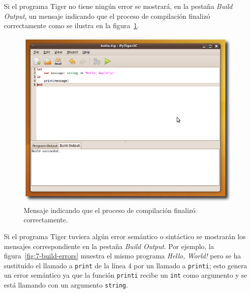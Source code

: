 \documentclass{article}
\begin{document}
\newpage

Si el programa Tiger no tiene ningún error se mostrará, en la pestaña
\emph{Build Output}, un mensaje indicando que el proceso de compilación
finalizó correctamente como se ilustra en la figura~\ref{fig:6-build-succeded}.

\begin{figure}[htb]
  \centering
  \includegraphics[width=5.5in]{gui/6-build-succeded}
  \caption{Mensaje indicando que el proceso de compilación finalizó
    correctamente.}
  \label{fig:6-build-succeded}
\end{figure}

\newpage

Si el programa Tiger tuviera algún error semántico o sintáctico se mostrarán
los mensajes correspondiente en la pestaña \emph{Build Output}. Por ejemplo,
la figura~\ref{fig:7-build-errors} muestra el mismo programa
\emph{Hello, World!} pero se ha sustituído el llamado a \texttt{print} de la
línea 4 por un llamado a \texttt{printi}; esto genera un error semántico
ya que la función \texttt{printi} recibe un \texttt{int} como argumento
y se está llamando con un argumento \texttt{string}.
\end{document}

